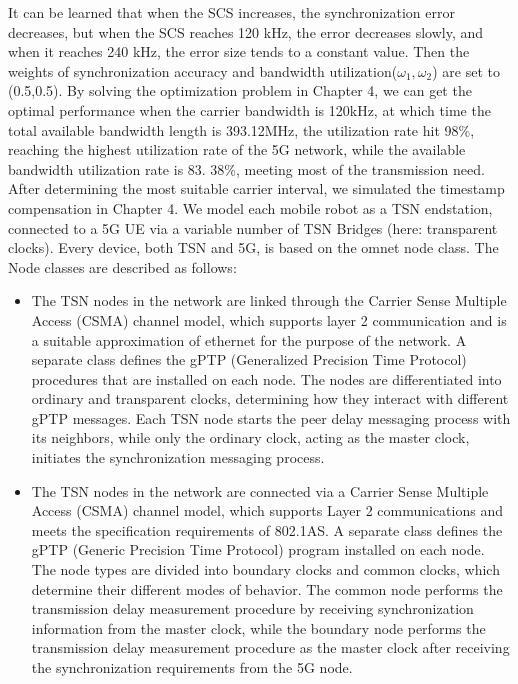 \documentclass[english]{cccconf}
\begin{document}
It can be learned that when the SCS increases, the synchronization error decreases, but when the SCS reaches 120 kHz, the error decreases slowly, and when it reaches 240 kHz, the error size tends to a constant value.
Then the weights of synchronization accuracy and bandwidth utilization($\omega_1,\omega_2$) are set to (0.5,0.5). By solving the optimization problem in Chapter 4, we can get the optimal performance when the carrier bandwidth is 120kHz, at which time the total available bandwidth length is 393.12MHz, the utilization rate hit 98\%, reaching the highest utilization rate of the 5G network, while the available bandwidth utilization rate is 83. 38\%, meeting most of the transmission need.
After determining the most suitable carrier interval, we simulated the timestamp compensation in Chapter 4.
We model each mobile robot as a TSN endstation, connected to a 5G UE via a variable number of TSN Bridges (here: transparent clocks). Every device, both TSN and 5G, is based on the omnet node class. The Node classes are described as follows: 
\begin{itemize}
	\item The TSN nodes in the network are linked through the Carrier Sense Multiple Access (CSMA) channel model, which supports layer 2 communication and is a suitable approximation of ethernet for the purpose of the network. A separate class defines the gPTP (Generalized Precision Time Protocol) procedures that are installed on each node. The nodes are differentiated into ordinary and transparent clocks, determining how they interact with different gPTP messages. Each TSN node starts the peer delay messaging process with its neighbors, while only the ordinary clock, acting as the master clock, initiates the synchronization messaging process.
	\item The TSN nodes in the network are connected via a Carrier Sense Multiple Access (CSMA) channel model, which supports Layer 2 communications and meets the specification requirements of 802.1AS. A separate class defines the gPTP (Generic Precision Time Protocol) program installed on each node. The node types are divided into boundary clocks and common clocks, which determine their different modes of behavior. The common node performs the transmission delay measurement procedure by receiving synchronization information from the master clock, while the boundary node performs the transmission delay measurement procedure as the master clock after receiving the synchronization requirements from the 5G node.
\end{itemize}
\end{document}
